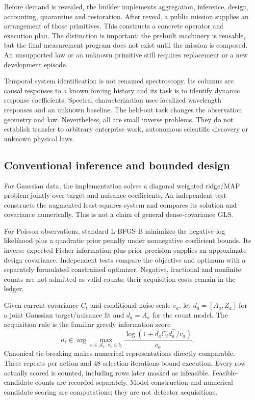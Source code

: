 \documentclass[11pt,letterpaper]{article}
\begin{document}
Before demand is revealed, the builder implements aggregation, inference, design, accounting, quarantine and restoration. After reveal, a public mission supplies an arrangement of those primitives. This constructs a concrete operator and execution plan. The distinction is important: the prebuilt machinery is reusable, but the final measurement program does not exist until the mission is composed. An unsupported law or an unknown primitive still requires replacement or a new development episode.

Temporal system identification is not renamed spectroscopy. Its columns are causal responses to a known forcing history and its task is to identify dynamic response coefficients. Spectral characterization uses localized wavelength responses and an unknown baseline. The held-out task changes the observation geometry and law. Nevertheless, all are small inverse problems. They do not establish transfer to arbitrary enterprise work, autonomous scientific discovery or unknown physical laws.

\subsection{Conventional inference and bounded design}

For Gaussian data, the implementation solves a diagonal weighted ridge/MAP problem jointly over target and nuisance coefficients. An independent test constructs the augmented least-squares system and compares its solution and covariance numerically. This is not a claim of general dense-covariance GLS.

For Poisson observations, standard L-BFGS-B minimizes the negative log likelihood plus a quadratic prior penalty under nonnegative coefficient bounds. Its inverse expected Fisher information plus prior precision supplies an approximate design covariance. Independent tests compare the objective and optimum with a separately formulated constrained optimizer. Negative, fractional and nonfinite counts are not admitted as valid counts; their acquisition costs remain in the ledger.

Given current covariance $C_t$ and conditional noise scale $v_a$, let $d_a=[A_a,Z_a]$ for a joint Gaussian target/nuisance fit and $d_a=A_a$ for the count model. The acquisition rule is the familiar greedy information score
\begin{equation}
a_t\in\arg\max_{a\in\mathcal A_t,\;c_a\leq b_t}
\frac{\log\!\left(1+d_aC_td_a^\top/v_a\right)}{c_a}.
\end{equation}
Canonical tie-breaking makes numerical representations directly comparable. Three repeats per action and 48 selection iterations bound execution. Every row actually scored is counted, including rows later masked as infeasible. Feasible-candidate counts are recorded separately. Model construction and numerical candidate scoring are computations; they are not detector acquisitions.
\end{document}
